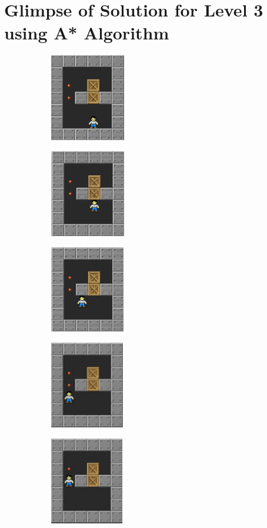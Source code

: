 \documentclass[10pt, final]{article}
\begin{document}
	\section{Glimpse of Solution for Level 3 using A* Algorithm}
		\begin{figure}[h!]
		{
			\begin{subfigure}[h!]{1.3in}
				\includegraphics[height=1.5in]{p1.png}
			\end{subfigure}
			\begin{subfigure}[h!]{1.3in}
				\includegraphics[height=1.5in]{p2.png}
			\end{subfigure}
			\begin{subfigure}[h!]{1.3in}
				\includegraphics[height=1.5in]{p3.png}
		\end{subfigure}
	\begin{subfigure}[h!]{1.3in}
		\includegraphics[height=1.5in]{p4.png}
\end{subfigure}
\begin{subfigure}[h!]{1.3in}
	\includegraphics[height=1.5in]{p5.png}
\end{subfigure}}
		\label{fig:chain}
	\end{figure}
\end{document}
